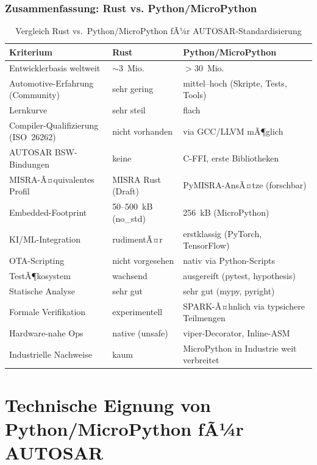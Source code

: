 ﻿\documentclass[12pt,a4paper,twoside]{article}
\begin{document}
\subsubsection{Zusammenfassung: Rust vs. Python/MicroPython}

\begin{table}[h]
\centering
\caption{Vergleich Rust vs.\ Python/MicroPython fÃ¼r AUTOSAR-Standardisierung}
\label{tab:rust_vs_python}
\begin{tabularx}{\textwidth}{lXX}
\toprule
\textbf{Kriterium} & \textbf{Rust} & \textbf{Python/MicroPython} \\
\midrule
Entwicklerbasis weltweit & $\sim$3~Mio. & $>$30~Mio. \\
Automotive-Erfahrung (Community) & sehr gering & mittel--hoch (Skripte, Tests, Tools) \\
Lernkurve & sehr steil & flach \\
Compiler-Qualifizierung (ISO~26262) & nicht vorhanden & via GCC/LLVM mÃ¶glich \\
AUTOSAR BSW-Bindungen & keine & C-FFI, erste Bibliotheken \\
MISRA-Ã¤quivalentes Profil & MISRA Rust (Draft) & PyMISRA-AnsÃ¤tze (forschbar) \\
Embedded-Footprint & 50--500~kB (no\_std) & 256~kB (MicroPython) \\
KI/ML-Integration & rudimentÃ¤r & erstklassig (PyTorch, TensorFlow) \\
OTA-Scripting & nicht vorgesehen & nativ via Python-Scripts \\
TestÃ¶kosystem & wachsend & ausgereift (pytest, hypothesis) \\
Statische Analyse & sehr gut & sehr gut (mypy, pyright) \\
Formale Verifikation & experimentell & SPARK-Ã¤hnlich via typsichere Teilmengen \\
Hardware-nahe Ops & native (unsafe) & viper-Decorator, Inline-ASM \\
Industrielle Nachweise & kaum & MicroPython in Industrie weit verbreitet \\
\bottomrule
\end{tabularx}
\end{table}

\section{Technische Eignung von Python/MicroPython fÃ¼r AUTOSAR}
\label{sec:technische_eignung}
\end{document}
